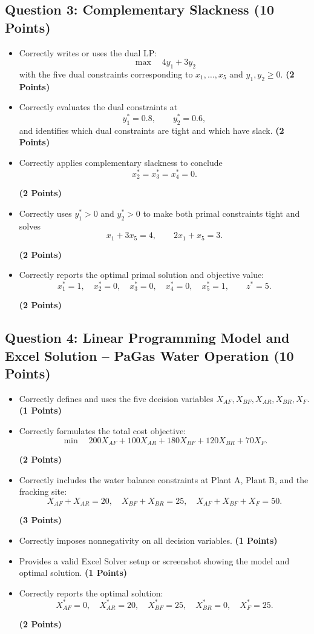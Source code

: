 \documentclass[11pt, letterpaper]{article}
\newcommand{\question}[2]{
    \subsection*{Question #1: #2}
}
\newcommand{\points}[1]{
    \textbf{(#1 Points)}
}
\begin{document}
\question{3}{Complementary Slackness \points{10}}

\begin{itemize}
    \item Correctly writes or uses the dual LP:
    \[
    \max \quad 4y_1+3y_2
    \]
    with the five dual constraints corresponding to $x_1,\ldots,x_5$ and
    $y_1,y_2\geq 0$. \points{2}

    \item Correctly evaluates the dual constraints at
    \[
    y_1^*=0.8,\qquad y_2^*=0.6,
    \]
    and identifies which dual constraints are tight and which have slack. \points{2}

    \item Correctly applies complementary slackness to conclude
    \[
    x_2^*=x_3^*=x_4^*=0.
    \]
    \points{2}

    \item Correctly uses $y_1^*>0$ and $y_2^*>0$ to make both primal constraints
    tight and solves
    \[
    x_1+3x_5=4,\qquad 2x_1+x_5=3.
    \]
    \points{2}

    \item Correctly reports the optimal primal solution and objective value:
    \[
    x_1^*=1,\quad x_2^*=0,\quad x_3^*=0,\quad x_4^*=0,\quad x_5^*=1,
    \qquad z^*=5.
    \]
    \points{2}
\end{itemize}


\question{4}{Linear Programming Model and Excel Solution -- PaGas Water Operation \points{10}}

\begin{itemize}
    \item Correctly defines and uses the five decision variables
    $X_{AF},X_{BF},X_{AR},X_{BR},X_F$. \points{1}

    \item Correctly formulates the total cost objective:
    \[
    \min \quad 200X_{AF}+100X_{AR}+180X_{BF}+120X_{BR}+70X_F.
    \]
    \points{2}

    \item Correctly includes the water balance constraints at Plant A, Plant B, and
    the fracking site:
    \[
    X_{AF}+X_{AR}=20,\quad
    X_{BF}+X_{BR}=25,\quad
    X_{AF}+X_{BF}+X_F=50.
    \]
    \points{3}

    \item Correctly imposes nonnegativity on all decision variables. \points{1}

    \item Provides a valid Excel Solver setup or screenshot showing the model and
    optimal solution. \points{1}

    \item Correctly reports the optimal solution:
    \[
    X_{AF}^*=0,\quad X_{AR}^*=20,\quad X_{BF}^*=25,\quad
    X_{BR}^*=0,\quad X_F^*=25.
    \]
    \points{2}
\end{itemize}
\end{document}
